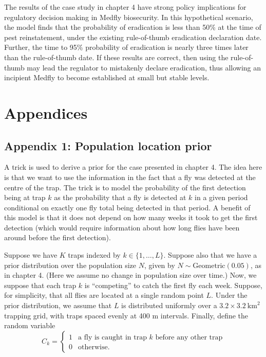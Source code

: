 \documentclass[
  oneside]{book}
\begin{document}
The results of the case study in chapter 4 have strong policy implications for regulatory decision making in Medfly biosecurity. In this hypothetical scenario, the model finds that the probability of eradication is less than 50\% at the time of pest reinstatement, under the existing rule-of-thumb eradication declaration date. Further, the time to 95\% probability of eradication is nearly three times later than the rule-of-thumb date. If these results are correct, then using the rule-of-thumb may lead the regulator to mistakenly declare eradication, thus allowing an incipient Medfly to become established at small but stable levels.

\hypertarget{appendices}{%
\chapter{Appendices}\label{appendices}}

\hypertarget{appendix-1-population-location-prior}{%
\section{Appendix 1: Population location prior}\label{appendix-1-population-location-prior}}

A trick is used to derive a prior for the case presented in chapter 4. The idea here is that we want to use the information in the fact that a fly was detected at the centre of the trap. The trick is to model the probability of the first detection being at trap \(k\) as the probability that a fly is detected at \(k\) in a given period conditional on exactly one fly total being detected in that period. A benefit of this model is that it does not depend on how many weeks it took to get the first detection (which would require information about how long flies have been around before the first detection).

Suppose we have \(K\) traps indexed by \(k \in \{1, \ldots, L\}\). Suppose also that we have a prior distribution over the population size \(N\), given by \(N \sim \mathrm{Geometric} (0.05)\), as in chapter 4. (Here we assume no change in population size over time.) Now, we suppose that each trap \(k\) is ``competing'' to catch the first fly each week. Suppose, for simplicity, that all flies are located at a single random point \(L\). Under the prior distribution, we assume that \(L\) is distributed uniformly over a \(3.2 \times 3.2 ~ \mathrm{km}^2\) trapping grid, with traps spaced evenly at 400 m intervals. Finally, define the random variable
\[
C_k = \begin{cases}1 & \text{a fly is caught in trap } k \text{ before any other trap} \\ 0 & \text{otherwise}. \end{cases}
\]
\end{document}
